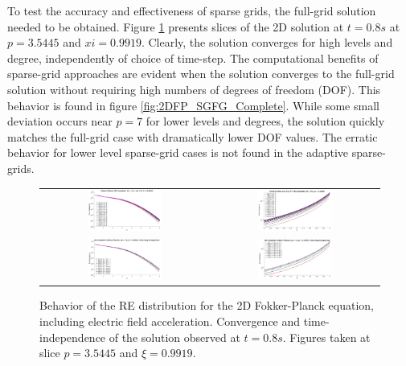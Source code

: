 \documentclass[preprint,11pt]{elsarticle}
\begin{document}
To test the accuracy and effectiveness of sparse grids, the full-grid solution needed to be obtained. Figure \ref{fig:2DFP_FG_Complete} presents slices of the 2D solution at $t = 0.8 s$ at $p = 3.5445$ and $xi = 0.9919$. Clearly, the solution converges for high levels and degree, independently of choice of time-step. The computational benefits of sparse-grid approaches are evident when the solution converges to the full-grid solution without requiring high numbers of degrees of freedom (DOF). This behavior is found in figure \ref{fig:2DFP_SGFG_Complete}. While some small deviation occurs near $p = 7$ for lower levels and degrees, the solution quickly matches the full-grid case with dramatically lower DOF values. The erratic behavior for lower level sparse-grid cases is not found in the adaptive sparse-grids. 
    
\begin{figure}[H]
\begin{tabular}{cc}
\centering
\includegraphics[width=0.46\textwidth]{FIGURES/SG_FG_2DComplete_FGFigs.jpg}
&\includegraphics[width=0.46\textwidth]{FIGURES/SG_FG_2DComplete_vert_FGFigs_lev3lev4lev5.jpg}
\\
\includegraphics[width=0.46\textwidth]{FIGURES/SG_FG_2DComplete_FGFigs_lev3_dt_compare.jpg}
&\includegraphics[width=0.46\textwidth]{FIGURES/SG_FG_2DComplete_vert_FGFigs_lev3_dt_compare.jpg}
\end{tabular}
\caption{Behavior of the RE distribution for the 2D Fokker-Planck equation, including electric field acceleration. Convergence and time-independence of the solution observed at $t = 0.8 s$. Figures taken at slice $p = 3.5445$ and $\xi = 0.9919$.}
\label{fig:2DFP_FG_Complete}
\end{figure}
\end{document}

